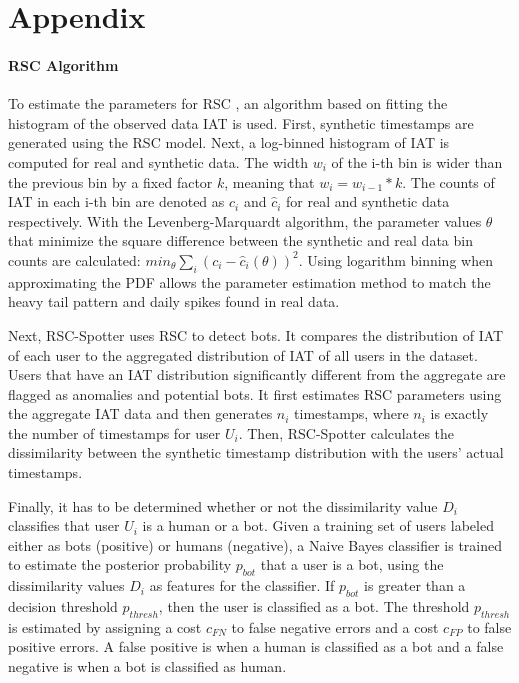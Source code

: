 \documentclass[11pt, oneside]{article}   	%
\begin{document}
\section{Appendix}
\paragraph*{RSC Algorithm}
\quad

\quad To estimate the parameters for RSC \cite{rsc}, an algorithm based on fitting the histogram of the observed data IAT is used.
First, synthetic timestamps are generated using the RSC model.
Next, a log-binned histogram of IAT is computed for real and synthetic data.
The width $w_i$ of the i-th bin is wider than the previous bin by a fixed factor $k$, meaning that $w_i=w_{i-1}*k$.
The counts of IAT in each i-th bin are denoted as $c_i$ and $\hat{c}_i$ for real and synthetic data respectively.
With the Levenberg-Marquardt algorithm, the parameter values $\theta$ that minimize the square difference between the synthetic and real data bin counts are calculated: $min_{\theta} \sum_i (c_i - \hat{c}_i(\theta))^2$.
Using logarithm binning when approximating the PDF allows the parameter estimation method to match the heavy tail pattern and daily spikes found in real data.

\quad Next, RSC-Spotter uses RSC to detect bots.
It compares the distribution of IAT of each user to the aggregated distribution of IAT of all users in the dataset.
Users that have an IAT distribution significantly different from the aggregate are flagged as anomalies and potential bots.
It first estimates RSC parameters using the aggregate IAT data and then generates $n_i$ timestamps, where $n_i$ is exactly the number of timestamps for user $U_i$.
Then, RSC-Spotter calculates the dissimilarity between the synthetic timestamp distribution with the users' actual timestamps.

\quad Finally, it has to be determined whether or not the dissimilarity value $D_i$ classifies that user $U_i$ is a human or a bot.
Given a training set of users labeled either as bots (positive) or humans (negative), a Naive Bayes classifier is trained to estimate the posterior probability $p_{bot}$ that a user is a bot, using the dissimilarity values $D_i$ as features for the classifier.
If $p_{bot}$ is greater than a decision threshold $p_{thresh}$, then the user is classified as a bot.
The threshold $p_{thresh}$ is estimated by assigning a cost $c_{FN}$ to false negative errors and a cost $c_{FP}$ to false positive errors.
A false positive is when a human is classified as a bot and a false negative is when a bot is classified as human.
\end{document}
